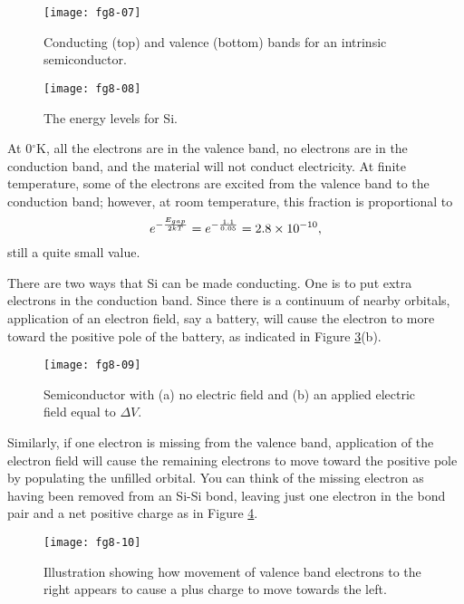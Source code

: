 \begin{figure}
\begin{center}
\texttt{[image: fg8-07]}
\end{center}
\caption{Conducting (top) and valence (bottom) bands for an intrinsic semiconductor.}
\label{chap8-fig7}
\end{figure}

\begin{figure}
\begin{center}
\texttt{[image: fg8-08]}
\end{center}
\caption{The energy levels for Si.}
\label{chap8-fig8}
\end{figure}


At 0$^{\circ}$K, all the electrons are in the valence band, no
electrons are in the conduction band, and the material will not
conduct electricity.  At finite temperature, some of the electrons are
excited from the valence band to the conduction band; however, at room
temperature, this fraction is proportional to
\begin{equation}
e^{-{E_{gap} \over 2kT}} = e^{-{1.1 \over 0.05}} = 2.8 \times 10^{-10},
\end{equation}
still a quite small value.

There are two ways that Si can be made conducting.  One is to put extra 
electrons in the conduction band.  Since there is a continuum of nearby 
orbitals, application of an electron field, say a battery, will cause 
the electron to more toward the positive pole of the battery, as
indicated in Figure \ref{chap8-fig9}(b).

\begin{figure}
\begin{center}
\texttt{[image: fg8-09]}
\end{center}
\caption{Semiconductor with (a) no electric field and (b) an applied
electric field equal to $\Delta V$.}
\label{chap8-fig9}
\end{figure}

Similarly, if one electron is missing from the valence 
band, application of the electron field will cause the remaining electrons 
to move toward the positive pole by populating the unfilled
orbital. You can think of the missing electron as having been removed from 
an Si-Si bond, leaving just one electron in the bond pair and a net positive 
charge as in Figure \ref{chap8-fig10}.

\begin{figure}
\begin{center}
\texttt{[image: fg8-10]}
\end{center}
\caption{Illustration showing how movement of valence band electrons 
to the right appears to cause a plus charge to move towards the left.}
\label{chap8-fig10}
\end{figure}

